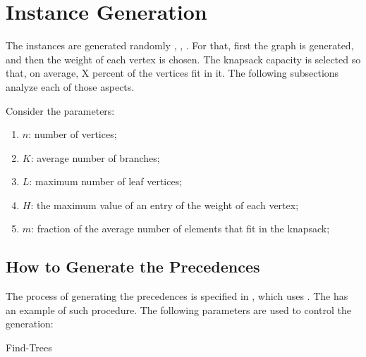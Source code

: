 \section{Instance Generation}

The instances are generated randomly \cite{bib:instances-CVRP}, \cite{bib:constrained-knapsack}, \cite{bib:grasp-and-tabu}. For that, first the graph is generated, and then the weight of each vertex is chosen. The knapsack capacity is selected so that, on average, X percent of the vertices fit in it. The following subsections analyze each of those aspects.

Consider the parameters:
\begin{enumerate}
    \item $n$: number of vertices;
    \item $K$: average number of branches;
    \item $L$: maximum number of leaf vertices;
    \item $H$: the maximum value of an entry of the weight of each vertex;
    \item $m$: fraction of the average number of elements that fit in the knapsack;
\end{enumerate}

\subsection{How to Generate the Precedences}

The process of generating the precedences is specified in , which uses . The  has an example of such procedure. The following parameters are used to control the generation:

\begin{algorithm}[ht!]
    \caption{Find-Trees}
    \label{algorith:find-trees}
    \begin{algorithmic}[1]
            \\
            \Else
            \EndIf
        \EndFor
        \\
    \end{algorithmic}
\end{algorithm}


